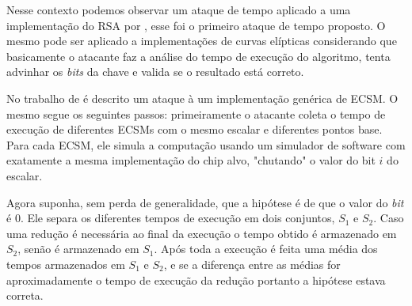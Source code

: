 Nesse contexto podemos observar um ataque de tempo aplicado a uma implementação do RSA por \cite{Kocher96}, esse foi o primeiro ataque de tempo proposto. O mesmo pode ser aplicado a implementações de curvas elípticas considerando que basicamente o atacante faz a análise do tempo de execução do algoritmo, tenta advinhar os \textit{bits} da chave e valida se o resultado está correto.

No trabalho de \cite{danger2013synthesis} é descrito um ataque à um implementação genérica de ECSM. O mesmo segue os seguintes passos: primeiramente o atacante coleta o tempo de execução de diferentes ECSMs com o mesmo escalar e diferentes pontos base. Para cada ECSM, ele simula a computação usando um simulador de software com exatamente a mesma implementação do chip alvo, "chutando" o valor do bit $i$ do escalar. 

Agora suponha, sem perda de generalidade, que a hipótese é de que o valor do \textit{bit} é $0$.  Ele separa os diferentes tempos de execução em dois conjuntos, $S_1$ e $S_2$. Caso uma redução é necessária ao final da execução o tempo obtido é armazenado em $S_2$, senão é armazenado em $S_1$. Após toda a execução é feita uma média dos tempos armazenados em $S_1$ e $S_2$, e se a diferença entre as médias for aproximadamente o tempo de execução da redução portanto a hipótese estava correta.

